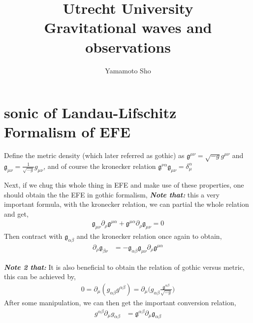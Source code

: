 \documentclass[a4paper, 12pt]{article}
\title{Utrecht University \\
        \large Gravitational waves and observations\\}
\author{Yamamoto Sho}
\begin{document}
\maketitle
\tableofcontents

\section{sonic of Landau-Lifschitz Formalism of EFE}%
  \label{sec:Speedrunning through Landau-Lifschitz Formalism of EFE}
 Define the metric density (which later referred as gothic) as \(
 \mathfrak{g}^{\mu \nu} = \sqrt{-g} g^{\mu \nu}  
 \) and \(
 \mathfrak{g}_{\mu \nu} = \frac{1}{\sqrt{-g}} g_{\mu \nu}  
 \), and of course the kronecker relation \( \mathfrak{g}^{\nu \alpha}
 \mathfrak{g}_{\mu \nu} = \delta_{\mu}^{\alpha} \)
 
 Next, if we chug this whole thing in EFE and make use of these properties,
 one should obtain the the EFE in gothic formalism, 
 \textbf{\textit{Note that:}} this a very important formula, 
  with the kronecker relation, we can partial the whole relation and get, 
  \begin{align}
    \label{partial gothic metric}
    \mathfrak{g}_{\mu \nu} \partial_{\rho}^{} \mathfrak{g}^{\mu \alpha}
    + \mathfrak{g}^{\mu \alpha} \partial_{\rho}^{} \mathfrak{g}_{\mu \nu}
    = 0 
  \end{align}
  Then contract with \( \mathfrak{g}_{\alpha \beta}
   \) and the kronecker relation once again to obtain, 
    \begin{align}
      \label{partial gmet conversion}
      \partial_{\rho}^{} \mathfrak{g}_{\beta \nu} &= -
      \mathfrak{g}_{\alpha \beta} \mathfrak{g}_{\mu \nu}
      \partial_{\rho}^{} \mathfrak{g}^{\mu \alpha}
    \end{align}

  \textbf{\textit{Note 2 that:}} It is also beneficial to obtain the
  relation of gothic versus metric, this can be achieved by, 
  \begin{align}
    \label{getting gothic metric}
    0 = \partial_{\mu}^{} (g_{\alpha \beta} g^{\alpha \beta} ) =
    \partial_{\mu}^{} \bigg( g_{\alpha \beta}
    \frac{\mathfrak{g}^{\alpha \beta}}{\sqrt{-g}}  \bigg) 
  \end{align}
  After some manipulation, we can then get the important conversion
  relation, 
  \begin{align}
    \label{conversion metric and gothic}
    g^{\alpha \beta} \partial_{\mu}^{} g_{\alpha \beta} &=
    \mathfrak{g}^{\alpha \beta} \partial_{\mu}^{}
    \mathfrak{g}_{\alpha \beta} 
  \end{align}
\end{document}
